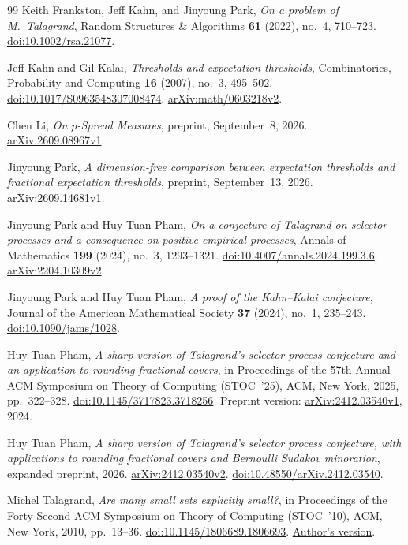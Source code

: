 \begin{thebibliography}{99}
Keith Frankston, Jeff Kahn, and Jinyoung Park,
\emph{On a problem of M.~Talagrand},
Random Structures \& Algorithms \textbf{61} (2022), no.~4, 710--723.
\href{https://doi.org/10.1002/rsa.21077}{doi:10.1002/rsa.21077}.

Jeff Kahn and Gil Kalai,
\emph{Thresholds and expectation thresholds},
Combinatorics, Probability and Computing \textbf{16} (2007), no.~3, 495--502.
\href{https://doi.org/10.1017/S0963548307008474}{doi:10.1017/S0963548307008474}.
\href{https://arxiv.org/abs/math/0603218v2}{arXiv:math/0603218v2}.

Chen Li,
\emph{On $p$-Spread Measures},
preprint, September~8, 2026.
\href{https://arxiv.org/abs/2609.08967v1}{arXiv:2609.08967v1}.

Jinyoung Park,
\emph{A dimension-free comparison between expectation thresholds and
fractional expectation thresholds},
preprint, September~13, 2026.
\href{https://arxiv.org/abs/2609.14681v1}{arXiv:2609.14681v1}.

Jinyoung Park and Huy Tuan Pham,
\emph{On a conjecture of Talagrand on selector processes and a consequence
on positive empirical processes},
Annals of Mathematics \textbf{199} (2024), no.~3, 1293--1321.
\href{https://doi.org/10.4007/annals.2024.199.3.6}{doi:10.4007/annals.2024.199.3.6}.
\href{https://arxiv.org/abs/2204.10309v2}{arXiv:2204.10309v2}.

Jinyoung Park and Huy Tuan Pham,
\emph{A proof of the Kahn--Kalai conjecture},
Journal of the American Mathematical Society \textbf{37} (2024), no.~1, 235--243.
\href{https://doi.org/10.1090/jams/1028}{doi:10.1090/jams/1028}.

Huy Tuan Pham,
\emph{A sharp version of Talagrand's selector process conjecture and an
application to rounding fractional covers},
in Proceedings of the 57th Annual ACM Symposium on Theory of Computing
(STOC~'25), ACM, New York, 2025, pp.~322--328.
\href{https://doi.org/10.1145/3717823.3718256}{doi:10.1145/3717823.3718256}.
Preprint version: \href{https://arxiv.org/abs/2412.03540v1}{arXiv:2412.03540v1}, 2024.

Huy Tuan Pham,
\emph{A sharp version of Talagrand's selector process conjecture, with
applications to rounding fractional covers and Bernoulli Sudakov minoration},
expanded preprint, 2026.
\href{https://arxiv.org/abs/2412.03540v2}{arXiv:2412.03540v2}.
\href{https://doi.org/10.48550/arXiv.2412.03540}{doi:10.48550/arXiv.2412.03540}.

Michel Talagrand,
\emph{Are many small sets explicitly small?},
in Proceedings of the Forty-Second ACM Symposium on Theory of Computing
(STOC~'10), ACM, New York, 2010, pp.~13--36.
\href{https://doi.org/10.1145/1806689.1806693}{doi:10.1145/1806689.1806693}.
\href{https://michel.talagrand.net/preprints/small.pdf}{Author's version}.

\end{thebibliography}
